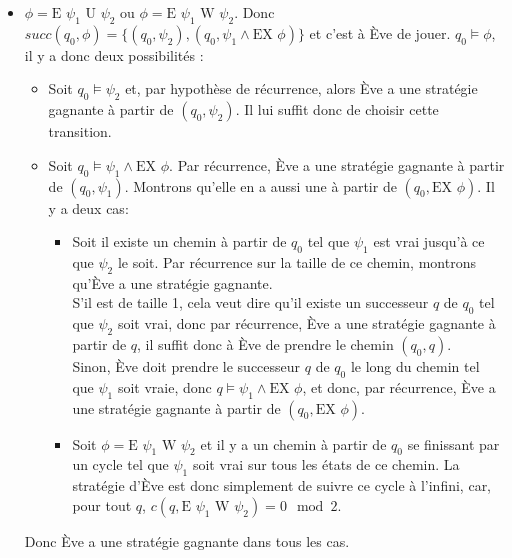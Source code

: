 \documentclass[10pt,a4paper]{article}
\begin{document}
\begin{itemize}
\item $\phi = \mbox{E } \psi_1 \mbox{ U } \psi_2$ ou $\phi = \mbox{E } \psi_1 \mbox{ W } \psi_2$. Donc $succ(q_0,\phi) = \{ (q_0,\psi_2), (q_0,\psi_1 \land \mbox{EX } \phi) \}$ et c'est à Ève de jouer. $q_0 \vDash \phi$, il y a donc deux possibilités :
\begin{itemize}
	\item Soit $q_0 \vDash \psi_2$ et, par hypothèse de récurrence, alors Ève a une stratégie gagnante à partir de $(q_0,\psi_2)$. Il lui suffit donc de choisir cette transition.
	\item Soit $q_0 \vDash \psi_1 \land \mbox{EX } \phi$.
	Par récurrence, Ève a une stratégie gagnante à partir de $(q_0,\psi_1)$.
	Montrons qu'elle en a aussi une à partir de $(q_0,\mbox{EX } \phi)$.
	Il y a deux cas:
	\begin{itemize}
		\item Soit il existe un chemin à partir de $q_0$ tel que $\psi_1$ est vrai jusqu'à ce que $\psi_2$ le soit. Par récurrence sur la taille de ce chemin, montrons qu'Ève a une stratégie gagnante.\\
		S'il est de taille 1, cela veut dire qu'il existe un successeur $q$ de $q_0$ tel que $\psi_2$ soit vrai, donc par récurrence, Ève a une stratégie gagnante à partir de $q$, il suffit donc à Ève de prendre le chemin $(q_0,q)$.\\
		Sinon, Ève doit prendre le successeur $q$ de $q_0$ le long du chemin tel que $\psi_1$ soit vraie, donc $q \vDash \psi_1 \land \mbox{EX } \phi$, et donc, par récurrence, Ève a une stratégie gagnante à partir de $(q_0,\mbox{EX } \phi)$.
		\item Soit $\phi = \mbox{E } \psi_1 \mbox{ W } \psi_2$ et il y a un chemin à partir de $q_0$ se finissant par un cycle tel que $\psi_1$ soit vrai sur tous les états de ce chemin. La stratégie d'Ève est donc simplement de suivre ce cycle à l'infini, car, pour tout $q$, $c(q,\mbox{E } \psi_1 \mbox{ W } \psi_2) = 0 \mod 2$.
	\end{itemize}
\end{itemize}
Donc Ève a une stratégie gagnante dans tous les cas.


\end{itemize}
\end{document}
